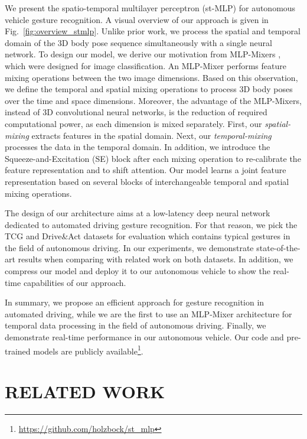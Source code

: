 \documentclass[letterpaper, 10 pt, conference]{ieeeconf}
\begin{document}
We present the spatio-temporal multilayer perceptron (st-MLP) for autonomous vehicle gesture recognition. A visual overview of our approach is given in Fig.~\ref{fig:overview_stmlp}. Unlike prior work, we process the spatial and temporal domain of the 3D body pose sequence simultaneously with a single neural network. To design our model, we derive our motivation from MLP-Mixers \cite{tolstikhin2021mlp}, which were designed for image classification. An MLP-Mixer performs feature mixing operations between the two image dimensions. Based on this observation, we define the temporal and spatial mixing operations to process 3D body poses over the time and space dimensions. Moreover, the advantage of the MLP-Mixers, instead of 3D convolutional neural networks, is the reduction of required computational power, as each dimension is mixed separately. First, our \textit{spatial-mixing} extracts features in the spatial domain. Next, our \textit{temporal-mixing} processes the data in the temporal domain. In addition, we introduce the Squeeze-and-Excitation (SE) block \cite{Hu_2018_CVPR} after each mixing operation to re-calibrate the feature representation and to shift attention. Our model learns a joint feature representation based on several blocks of interchangeable temporal and spatial mixing operations.

The design of our architecture aims at a low-latency deep neural network dedicated to automated driving gesture recognition. For that reason, we pick the TCG \cite{wiederer2020traffic} and Drive\&Act \cite{drive_and_act_2019_iccv} datasets for evaluation which contains typical gestures in the field of autonomous driving. In our experiments, we demonstrate state-of-the-art results when comparing with related work on both datasets. In addition, we compress our model and deploy it to our autonomous vehicle to show the real-time capabilities of our approach.

In summary, we propose an efficient approach for gesture recognition in automated driving, while we are the first to use an MLP-Mixer architecture for temporal data processing in the field of autonomous driving. Finally, we demonstrate real-time performance in our autonomous vehicle. Our code and pre-trained models are publicly available\footnote[1]{\url{https://github.com/holzbock/st_mlp}}.


\section{RELATED WORK}
\end{document}
